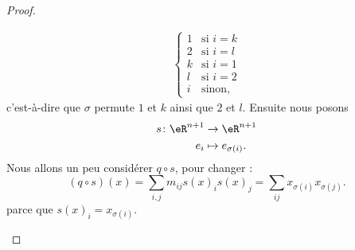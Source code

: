\begin{proof}
\begin{subproof}
\begin{equation}
\begin{aligned}
\begin{cases}
                         1   &   \text{si } i=k\\
                         2   &   \text{si } i=l\\
                         k   &   \text{si } i=1\\
                         l   &   \text{si } i=2\\
                        i    &    \text{sinon,}
                    \end{cases}
                \end{aligned}
            \end{equation}
            c'est-à-dire que \( \sigma\) permute \( 1\) et \( k\) ainsi que \( 2\) et \( l\). Ensuite nous posons
            \begin{equation}
                \begin{aligned}
                    s\colon \eR^{n+1}&\to \eR^{n+1} \\
                    e_i&\mapsto e_{\sigma(i)}. 
                \end{aligned}
            \end{equation}
            Nous allons un peu considérer \( q\circ s\), pour changer : 
            \begin{equation}        \label{EQooLVAWooAirEzP}
                (q\circ s)(x)=\sum_{i,j}m_{ij}s(x)_is(x)_j=\sum_{ij}x_{\sigma(i)}x_{\sigma(j)}.
            \end{equation}
            parce que \( s(x)_i=x_{\sigma(i)}\). 


\end{subproof}
\end{proof}
